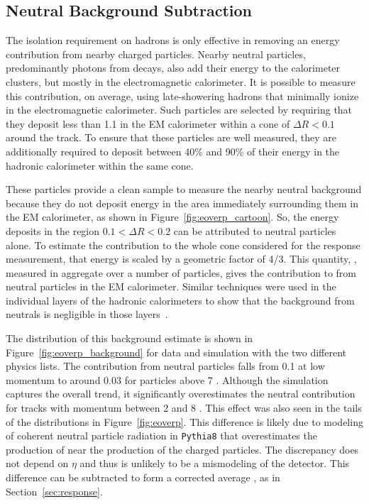 \subsection{Neutral Background Subtraction}
\label{sec:neutral_bg}

The isolation requirement on hadrons is only effective in removing an energy contribution from nearby charged particles. 
Nearby neutral particles, predominantly photons from \piz decays, also add their energy to the calorimeter clusters, but mostly in the electromagnetic calorimeter. 
It is possible to measure this contribution, on average, using late-showering hadrons that minimally ionize in the electromagnetic calorimeter. 
Such particles are selected by requiring that they deposit less than 1.1 \GeV in the EM calorimeter within a cone of $\Delta R < 0.1$ around the track. 
To ensure that these particles are well measured, they are additionally required to deposit between 40\% and 90\% of their energy in the hadronic calorimeter within the same cone. 

These particles provide a clean sample to measure the nearby neutral background because they do not deposit energy in the area immediately surrounding them in the EM calorimeter, as shown in Figure~\ref{fig:eoverp_cartoon}.
So, the energy deposits in the region $0.1 < \Delta R < 0.2$ can be attributed to neutral particles alone.
To estimate the contribution to the whole cone considered for the response measurement, that energy is scaled by a geometric factor of 4/3. 
This quantity, \epbg, measured in aggregate over a number of particles, gives the contribution to \epav from neutral particles in the EM calorimeter. 
Similar techniques were used in the individual layers of the hadronic calorimeters to show that the background from neutrals is negligible in those layers~\cite{PERF-2011-05}. 

The distribution of this background estimate is shown in Figure~\ref{fig:eoverp_background} for data and simulation with the two different physics lists.
The contribution from neutral particles falls from 0.1 at low momentum to around 0.03 for particles above 7 \GeV. 
Although the simulation captures the overall trend, it significantly overestimates the neutral contribution for tracks with momentum between 2 and 8 \GeV.
This effect was also seen in the tails of the \ep distributions in Figure~\ref{fig:eoverp}.
This difference is likely due to modeling of coherent neutral particle radiation in \texttt{Pythia8} that overestimates the production of \piz near the production of the charged particles.
The discrepancy does not depend on $\eta$ and thus is unlikely to be a mismodeling of the detector.
This difference can be subtracted to form a corrected average \ep, as in Section~\ref{sec:response}.

